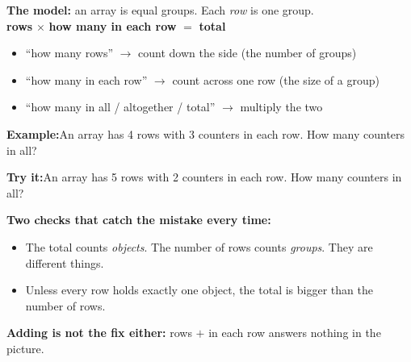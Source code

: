 \documentclass[12pt]{article}
\begin{document}


\begin{formulabox}
\textbf{The model:} an array is equal groups. Each \emph{row} is one group.\\[3pt]
\textbf{rows} $\times$ \textbf{how many in each row} $=$ \textbf{total}
\begin{itemize}[leftmargin=0.8cm, itemsep=0pt, topsep=1pt]
  \item ``how many rows'' $\rightarrow$ count down the side (the number of groups)
  \item ``how many in each row'' $\rightarrow$ count across one row (the size of a group)
  \item ``how many in all / altogether / total'' $\rightarrow$ multiply the two
\end{itemize}
\end{formulabox}

\begin{examplebox}
\textbf{Example:}\quad An array has 4 rows with 3 counters in each row. How many counters in all?
\end{examplebox}

\begin{tryitbox}
\textbf{Try it:}\quad An array has 5 rows with 2 counters in each row. How many counters in all?\\[2pt]
\end{tryitbox}


\begin{formulabox}
\textbf{Two checks that catch the mistake every time:}
\begin{itemize}[leftmargin=0.8cm, itemsep=0pt, topsep=1pt]
  \item The total counts \emph{objects}. The number of rows counts \emph{groups}. They are different things.
  \item Unless every row holds exactly one object, the total is bigger than the number of rows.
\end{itemize}
\textbf{Adding is not the fix either:} rows $+$ in each row answers nothing in the picture.
\end{formulabox}
\end{document}
